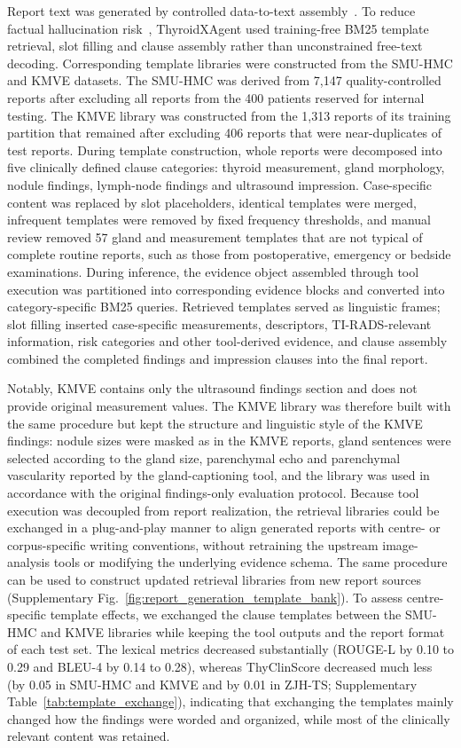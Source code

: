 \documentclass[fleqn,10pt]{wlscirep}
\begin{document}
Report text was generated by controlled data-to-text assembly~\cite{rebuff_data2text_2020}. To reduce factual hallucination risk~\cite{farquhar2024detecting}, ThyroidXAgent used training-free BM25 template retrieval, slot filling and clause assembly rather than unconstrained free-text decoding. Corresponding template libraries were constructed from the SMU-HMC and KMVE datasets. The SMU-HMC was derived from 7,147 quality-controlled reports after excluding all reports from the 400 patients reserved for internal testing. The KMVE library was constructed from the 1,313 reports of its training partition that remained after excluding 406 reports that were near-duplicates of test reports. During template construction, whole reports were decomposed into five clinically defined clause categories: thyroid measurement, gland morphology, nodule findings, lymph-node findings and ultrasound impression. Case-specific content was replaced by slot placeholders, identical templates were merged, infrequent templates were removed by fixed frequency thresholds, and manual review removed 57 gland and measurement templates that are not typical of complete routine reports, such as those from postoperative, emergency or bedside examinations. During inference, the evidence object assembled through tool execution was partitioned into corresponding evidence blocks and converted into category-specific BM25 queries. Retrieved templates served as linguistic frames; slot filling inserted case-specific measurements, descriptors, TI-RADS-relevant information, risk categories and other tool-derived evidence, and clause assembly combined the completed findings and impression clauses into the final report.

Notably, KMVE contains only the ultrasound findings section and does not provide original measurement values. The KMVE library was therefore built with the same procedure but kept the structure and linguistic style of the KMVE findings: nodule sizes were masked as in the KMVE reports, gland sentences were selected according to the gland size, parenchymal echo and parenchymal vascularity reported by the gland-captioning tool, and the library was used in accordance with the original findings-only evaluation protocol. Because tool execution was decoupled from report realization, the retrieval libraries could be exchanged in a plug-and-play manner to align generated reports with centre- or corpus-specific writing conventions, without retraining the upstream image-analysis tools or modifying the underlying evidence schema. The same procedure can be used to construct updated retrieval libraries from new report sources (Supplementary Fig.~\ref{fig:report_generation_template_bank}). To assess centre-specific template effects, we exchanged the clause templates between the SMU-HMC and KMVE libraries while keeping the tool outputs and the report format of each test set. The lexical metrics decreased substantially (ROUGE-L by 0.10 to 0.29 and BLEU-4 by 0.14 to 0.28), whereas ThyClinScore decreased much less (by 0.05 in SMU-HMC and KMVE and by 0.01 in ZJH-TS; Supplementary Table~\ref{tab:template_exchange}), indicating that exchanging the templates mainly changed how the findings were worded and organized, while most of the clinically relevant content was retained.
\end{document}

